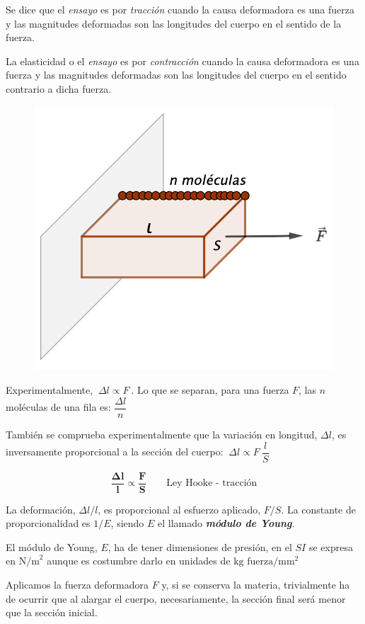 \begin{multicols}{2}

Se dice que el \emph{ensayo} es por \emph{tracción} cuando la causa deformadora es una fuerza y las magnitudes deformadas son las longitudes del cuerpo en el sentido de la fuerza.

La elasticidad o el \emph{ensayo} es por \emph{contracción} cuando la causa deformadora es una fuerza y las magnitudes deformadas son las longitudes del cuerpo en el sentido contrario a dicha fuerza.
\begin{figure}[H]
	\centering
	\includegraphics[width=.5\textwidth]{imagenes/imagenes09/T09IM02.png}
\end{figure}
\end{multicols}

Experimentalmente, $\ \Delta l \propto F \ $. Lo que se separan, para una fuerza $F$, las $n$ moléculas de una fila es: $\dfrac {\Delta l}{n}$ 

También se comprueba experimentalmente que la variación en longitud, $\Delta l$, es inversamente proporcional a la sección del cuerpo: $\ \Delta l \propto F \ \dfrac{l}{S}$ 

\begin{equation}
 \boldsymbol{\dfrac {\Delta l}{l} \propto \dfrac F S} \qquad \text{Ley Hooke - tracción}	
\end{equation}

La deformación, $\Delta l / l$, es proporcional al esfuerzo aplicado, $F/S$. La constante de proporcionalidad es $1/E$, siendo $E$ el llamado \textbf{\emph{módulo de Young}}.

El módulo de Young, $E$, ha de tener dimensiones de presión, en el $SI$ se expresa en $\mathrm{N/m}^2$ aunque es costumbre darlo en unidades de $\mathrm{kg} \text{ fuerza}/\mathrm{mm}^2$

Aplicamos la fuerza deformadora $F$ y, si se conserva la materia, trivialmente ha de ocurrir que al alargar el cuerpo, necesariamente, la sección final será menor que la sección inicial.

